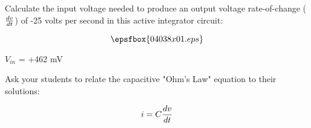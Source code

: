

Calculate the input voltage needed to produce an output voltage rate-of-change ($dv \over dt$) of -25 volts per second in this active integrator circuit:

$$\epsfbox{04038x01.eps}$$







$V_{in}$ = +462 mV







Ask your students to relate the capacitive "Ohm's Law" equation to their solutions:

$$i = C {dv \over dt}$$




